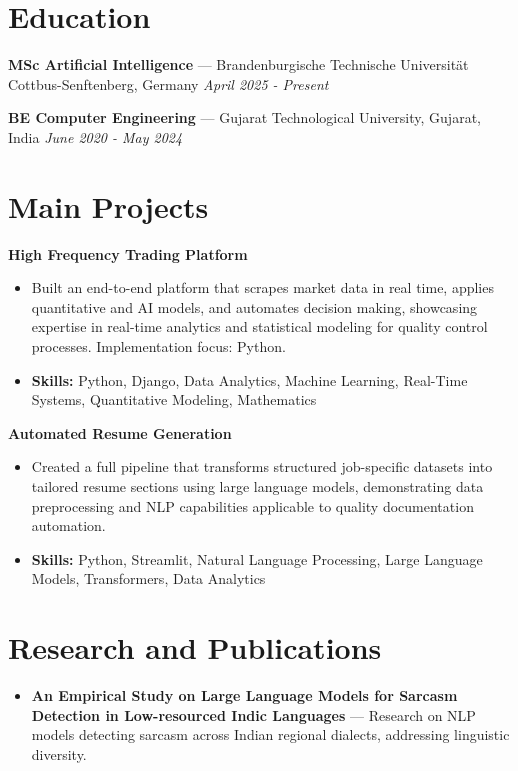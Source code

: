 \documentclass[a4paper,10pt]{article}
\begin{document}
\section*{Education}
\textbf{MSc Artificial Intelligence} — Brandenburgische Technische Universität Cottbus-Senftenberg, Germany \hfill \textit{April 2025 - Present}\par
\vspace{1.5pt}
\textbf{BE Computer Engineering} — Gujarat Technological University, Gujarat, India \hfill \textit{June 2020 - May 2024}\par

\section*{Main Projects}
\textbf{High Frequency Trading Platform}\par
\vspace{1pt}
\begin{itemize}
  \item Built an end-to-end platform that scrapes market data in real time, applies quantitative and AI models, and automates decision making, showcasing expertise in real-time analytics and statistical modeling for quality control processes. Implementation focus: Python.
  \item \textbf{Skills:} Python, Django, Data Analytics, Machine Learning, Real-Time Systems, Quantitative Modeling, Mathematics
\end{itemize}
\vspace{3pt}
\textbf{Automated Resume Generation}\par
\vspace{1pt}
\begin{itemize}
  \item Created a full pipeline that transforms structured job-specific datasets into tailored resume sections using large language models, demonstrating data preprocessing and NLP capabilities applicable to quality documentation automation.
  \item \textbf{Skills:} Python, Streamlit, Natural Language Processing, Large Language Models, Transformers, Data Analytics
\end{itemize}

\section*{Research and Publications}
\begin{itemize}
\item \textbf{An Empirical Study on Large Language Models for Sarcasm Detection in Low-resourced Indic Languages} — Research on NLP models detecting sarcasm across Indian regional dialects, addressing linguistic diversity.
\end{itemize}
\end{document}
